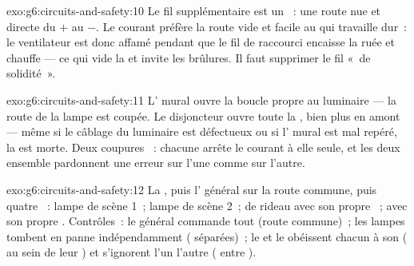 \begin{solution}{exo:g6:circuits-and-safety:10}
Le fil supplémentaire est un ~: une route nue et directe
du $+$ au $-$. Le courant préfère la route vide et facile au 
qui travaille dur~: le ventilateur est donc affamé pendant que le fil
de raccourci encaisse la ruée et chauffe --- ce qui vide la  et
invite les brûlures. Il faut supprimer le fil «~de solidité~».
\end{solution}

\begin{solution}{exo:g6:circuits-and-safety:11}
L' mural ouvre la boucle propre au luminaire --- la route
de la lampe est coupée. Le disjoncteur ouvre toute la , bien
plus en amont --- même si le câblage du luminaire est défectueux ou
si l' mural est mal repéré, la  est morte. Deux
coupures ~: chacune arrête le courant à elle seule, et les
deux ensemble pardonnent une erreur sur l'une comme sur l'autre.
\end{solution}

\begin{solution}{exo:g6:circuits-and-safety:12}
La , puis l' général sur la route commune, puis
quatre  ~: lampe de scène 1~; lampe de scène 2~;
 de rideau avec son propre  ~;  avec
son propre  . Contrôles~: le général commande
tout (route commune)~; les lampes tombent en panne indépendamment
( séparées)~; le  et le  obéissent chacun à son
 ( au sein de leur ) et s'ignorent l'un
l'autre ( entre ).
\end{solution}

